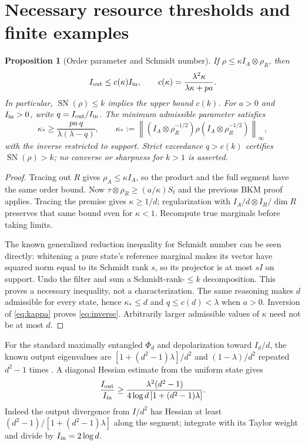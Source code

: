 \documentclass[11pt]{article}
\newtheorem{proposition}[theorem]{Proposition}
\newcommand{\SN}{\operatorname{SN}}
\begin{document}
\section{Necessary resource thresholds and finite examples}
\begin{proposition}[Order parameter and Schmidt number]\label{prop:schmidt}
If $\rho\le\kappa I_A\otimes\rho_R$, then
\begin{equation}\label{eq:kappa}
 I_{\rm out}\le c(\kappa)I_{\rm in},\qquad
 c(\kappa)=\frac{\lambda^2\kappa}{\lambda\kappa+pa}.
\end{equation}
In particular, $\SN(\rho)\le k$ implies the upper bound $c(k)$. For $a>0$ and $I_{\rm in}>0$, write $q=I_{\rm out}/I_{\rm in}$. The minimum admissible parameter satisfies
\begin{equation}\label{eq:inverse}
 \kappa_*\ge\frac{pa\,q}{\lambda(\lambda-q)},\qquad
 \kappa_*:=\left\|(I_A\otimes\rho_R^{-1/2})\rho(I_A\otimes\rho_R^{-1/2})\right\|_\infty,
\end{equation}
with the inverse restricted to support. Strict exceedance $q>c(k)$ certifies $\SN(\rho)>k$; no converse or sharpness for $k>1$ is asserted.
\end{proposition}
\begin{proof}
Tracing out $R$ gives $\rho_A\le\kappa I_A$, so the product and the full segment have the same order bound. Now $\tau\otimes\rho_R\ge(a/\kappa)S_t$ and the previous BKM proof applies. Tracing the premise gives $\kappa\ge1/d$; regularization with $I_A/d\otimes I_R/\dim R$ preserves that same bound even for $\kappa<1$. Recompute true marginals before taking limits.

The known generalized reduction inequality for Schmidt number \cite{schmidt} can be seen directly: whitening a pure state's reference marginal makes its vector have squared norm equal to its Schmidt rank $s$, so its projector is at most $sI$ on support. Undo the filter and sum a Schmidt-rank-$\le k$ decomposition. This proves a necessary inequality, not a characterization. The same reasoning makes $d$ admissible for every state, hence $\kappa_*\le d$ and $q\le c(d)<\lambda$ when $a>0$. Inversion of \eqref{eq:kappa} proves \eqref{eq:inverse}. Arbitrarily larger admissible values of $\kappa$ need not be at most $d$.
\end{proof}

For the standard maximally entangled $\Phi_d$ and depolarization toward $I_d/d$, the known output eigenvalues are $[1+(d^2-1)\lambda]/d^2$ and $(1-\lambda)/d^2$ repeated $d^2-1$ times \cite{bsst}. A diagonal Hessian estimate from the uniform state gives
\begin{equation}\label{eq:isotropic}
 \frac{I_{\rm out}}{I_{\rm in}}
 \ge\frac{\lambda^2(d^2-1)}{4\log d\,[1+(d^2-1)\lambda]}.
\end{equation}
Indeed the output divergence from $I/d^2$ has Hessian at least $(d^2-1)/[1+(d^2-1)\lambda]$ along the segment; integrate with its Taylor weight and divide by $I_{\rm in}=2\log d$.
\end{document}
